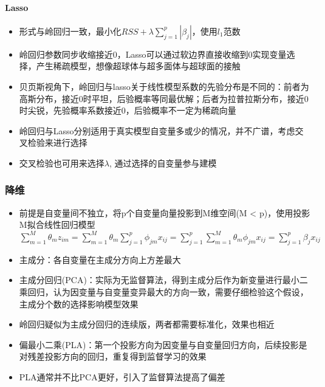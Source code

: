\documentclass[
]{book}
\providecommand{\tightlist}{%
  \setlength{\itemsep}{0pt}\setlength{\parskip}{0pt}}
\begin{document}
\hypertarget{lasso}{%
\paragraph{Lasso}\label{lasso}}

\begin{itemize}
\tightlist
\item
  形式与岭回归一致，最小化\(RSS + \lambda \sum_{j = 1}^{p} |\beta_j|\)，使用\(l_1\)范数
\item
  岭回归参数同步收缩接近0，Lasso可以通过软边界直接收缩到0实现变量选择，产生稀疏模型，想像超球体与超多面体与超球面的接触
\item
  贝页斯视角下，岭回归与lasso关于线性模型系数的先验分布是不同的：前者为高斯分布，接近0时平坦，后验概率等同最优解；后者为拉普拉斯分布，接近0时尖锐，先验概率系数接近0，后验概率不一定为稀疏向量
\item
  岭回归与Lasso分别适用于真实模型自变量多或少的情况，并不广谱，考虑交叉检验来进行选择
\item
  交叉检验也可用来选择\(\lambda\), 通过选择的自变量参与建模
\end{itemize}

\hypertarget{ux964dux7ef4}{%
\subsubsection{降维}\label{ux964dux7ef4}}

\begin{itemize}
\tightlist
\item
  前提是自变量间不独立，将p个自变量向量投影到M维空间(M \textless{} p)，使用投影M拟合线性回归模型 \(\sum_{m = 1}^{M}\theta_m z_{im} = \sum_{m = 1}^{M} \theta_m \sum_{j = 1}^{p} \phi_{jm}x_{ij} = \sum_{j = 1}^p \sum_{m = 1}^{M} \theta_m \phi_{jm} x_{ij} = \sum_{j = 1}^{p} \beta_j x_{ij}\)
\item
  主成分：各自变量在主成分方向上方差最大
\item
  主成分回归(PCA)：实际为无监督算法，得到主成分后作为新变量进行最小二乘回归，认为因变量与自变量变异最大的方向一致，需要仔细检验这个假设，主成分个数的选择影响模型效果
\item
  岭回归疑似为主成分回归的连续版，两者都需要标准化，效果也相近
\item
  偏最小二乘(PLA)：第一个投影方向为因变量与自变量回归方向，后续投影是对残差投影方向的回归，重复得到监督学习的效果
\item
  PLA通常并不比PCA更好，引入了监督算法提高了偏差
\end{itemize}
\end{document}
